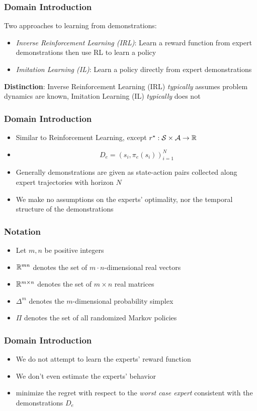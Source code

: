 \documentclass{beamer}
\begin{document}
\begin{frame}
\frametitle{Domain Introduction}
Two approaches to learning from demonstrations:
\begin{itemize}
	\item \emph{Inverse Reinforcement Learning (IRL)}: Learn a reward function from expert demonstrations then use RL to learn a policy
	\item \emph{Imitation Learning (IL)}: Learn a policy directly from expert demonstrations
\end{itemize}
\textbf{Distinction}: Inverse Reinforcement Learning (IRL) \emph{typically} assumes problem dynamics are known, Imitation Learning (IL) \emph{typically} does not
\end{frame}

\begin{frame}
\frametitle{Domain Introduction}
	\begin{itemize}
		\item Similar to Reinforcement Learning, except $r^\star : \mathcal{S} \times \mathcal{A} \to \mathbb{R}$
		\item $$D_e = (s_i, \pi_e(s_i))_{i=1}^N$$
		\item Generally demonstrations are given as state-action pairs collected along expert trajectories with horizon $N$
		\item We make no assumptions on the experts' optimality, nor the temporal structure of the demonstrations
	\end{itemize}
\end{frame}

\begin{frame}
	\frametitle{Notation}
	\begin{itemize}
		\item Let $m, n$ be positive integers
		\item $\mathbb{R}^{mn}$ denotes the set of $m \cdot n$-dimensional real vectors
		\item $\mathbb{R}^{m \times n}$ denotes the set of $m \times n$ real matrices
		\item $\Delta^m$ denotes the $m$-dimensional probability simplex
		\item $\Pi$ denotes the set of all randomized Markov policies
	\end{itemize}
\end{frame}

\begin{frame}
\frametitle{Domain Introduction}
	\begin{itemize}
		\item We do not attempt to learn the experts' reward function
		\item We don't even estimate the experts' behavior
		\item minimize the regret with respect to the \emph{worst case expert} consistent with the demonstrations $D_e$
	\end{itemize}
\end{frame}
\end{document}
